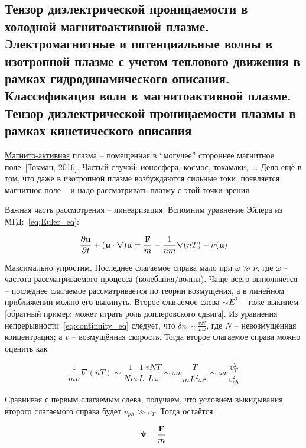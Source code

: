 \documentclass[10pt, a4paper]{article}
\newcommand{\Tokman}{~[Токман, 2016]}
\begin{document}
\subsection{Тензор диэлектрической проницаемости в холодной магнитоактивной плазме. Электромагнитные и потенциальные волны в изотропной плазме с учетом теплового движения в рамках гидродинамического описания. Классификация волн в магнитоактивной плазме. Тензор диэлектрической проницаемости плазмы в рамках кинетического описания} \label{subsec:cold_magentic_plasma_waves}

\uline{Магнито-активная} плазма -- помещенная в ``могучее'' стороннее магнитное поле\Tokman. Частый случай: ионосфера, космос, токамаки, $\ldots$ Дело ещё в том, что даже в изотропной плазме возбуждаются сильные токи, появляется магнитное поле -- и надо рассматривать плазму с этой точки зрения.

Важная часть рассмотрения -- линеаризация. Вспомним уравнение Эйлера из МГД:~\eqref{eq:Euler_eq}:

\begin{equation*}
	\pdv{\vb{u}}{t}+(\vb{u}\cdot\nabla)\vb{u} = \frac{\vb{F}}{m} -\frac{1}{nm}\nabla(nT)-\nu(\vb{u})
\end{equation*}

Максимально упростим. Последнее слагаемое справа мало при $\omega\gg\nu$, где $\omega$ -- частота рассматриваемого процесса (колебания/волны). Чаще всего выполняется -- последнее слагаемое рассматривается по теории возмущения, а в линейном приближении можно его выкинуть. Второе слагаемое слева $\sim E^2$ -- тоже выкинем [обратный пример: может играть роль доплеровского сдвига]. Из уравнения непрерывности~\eqref{eq:continuity_eq} следует, что $\delta n \sim \frac{vN}{L\omega}$, где $N$ -- невозмущённая концентрация; а $v$ -- возмущённая скорость. Тогда второе слагаемое справа можно оценить как

\begin{equation*}
	\frac{1}{mn}\nabla(nT)\sim\frac{1}{Nm}\frac{1}{L}\frac{vNT}{L\omega}\sim\omega v\frac{T}{mL^2\omega^2}\sim\omega v\frac{v_T^2}{v_{ph}^2}
\end{equation*} 

Сравнивая с первым слагаемым слева, получаем, что условием выкидывания второго слагаемого справа будет $v_{ph}\gg v_T$. Тогда остаётся:

\begin{equation*}
	\dot{\vb{v}}=\frac{\vb{F}}{m}
\end{equation*}
\end{document}
